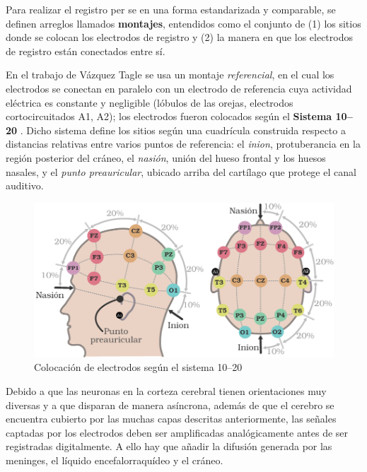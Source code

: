 Para realizar el registro per se en una forma estandarizada y comparable, se definen
arreglos llamados \textbf{montajes}, entendidos como el conjunto de (1) los sitios donde se colocan 
los electrodos de registro y (2) la manera en que los electrodos de registro están conectados entre 
sí.

En el trabajo de Vázquez Tagle \cite{VazquezTagle16} se usa un montaje \textit{referencial}, en el 
cual los electrodos se conectan en paralelo con un electrodo de referencia cuya actividad eléctrica 
es constante y negligible (lóbulos de las orejas, electrodos cortocircuitados A1, A2); los 
electrodos fueron colocados según el \textbf{Sistema 10--20} \cite{Klem99}.
%
Dicho sistema define los sitios según una cuadrícula construida respecto a distancias relativas 
entre varios puntos de referencia: el \textit{inion}, protuberancia en la región posterior del 
cráneo, el \textit{nasión}, unión del hueso frontal y los huesos nasales, y el \textit{punto 
preauricular}, ubicado arriba del cartílago que protege el canal auditivo.

\begin{figure}
\centering
\includegraphics[width=\linewidth]{./img_diagramas/cabeza_proporcionada_color_v4.pdf} 
\caption{Colocación de electrodos según el sistema 10--20}
\label{img1020}
\end{figure}

Debido a que las neuronas en la corteza cerebral tienen orientaciones muy diversas y a que disparan 
de manera asíncrona, además de que el cerebro se encuentra cubierto por las muchas capas descritas
anteriormente, las señales captadas por los electrodos deben ser amplificadas analógicamente antes 
de ser registradas digitalmente.
%
A ello hay que añadir la difusión generada por las meninges, el líquido encefalorraquídeo y el 
cráneo.

